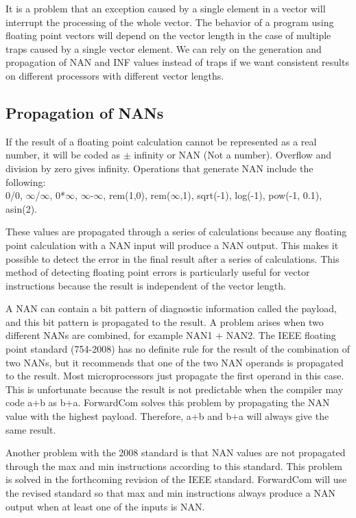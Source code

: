 \documentclass[forwardcom.tex]{subfiles}
\begin{document}
It is a problem that an exception caused by a single element in a vector will interrupt the processing of the whole vector. The behavior of a program using floating point vectors will depend on the vector length in the case of multiple traps caused by a single vector element. We can rely on the generation and propagation of NAN and INF values instead of traps if we want consistent results on different processors with different vector lengths. 
\vspace{2mm}

\subsection{Propagation of NANs}
\label{nanPropagation}
If the result of a floating point calculation cannot be represented as a real number, it will be coded as $\pm$ infinity or NAN (Not a number). Overflow and division by zero gives infinity.
Operations that generate NAN include the following:\\
0/0, $\infty$/$\infty$, 0*$\infty$, $\infty$-$\infty$, rem(1,0), rem($\infty$,1), sqrt(-1), log(-1), pow(-1, 0.1), asin(2).
\vspace{2mm}

These values are propagated through a series of calculations because any floating point calculation with a NAN input will produce a NAN output. This makes it possible to detect the error in the final result after a series of calculations. This method of detecting floating point errors is particularly useful for vector instructions because the result is independent of the vector length.
\vspace{2mm}

A NAN can contain a bit pattern of diagnostic information called the payload, and this bit pattern is propagated to the result. A problem arises when two different NANs are combined, for example NAN1 + NAN2. The IEEE floating point standard (754-2008) has no definite rule for the result of the combination of two NANs, but it recommends that one of the two NAN operands is propagated to the result. Most microprocessors just propagate the first operand in this case. This is unfortunate because the result is not predictable when the compiler may code a+b as b+a. ForwardCom solves this problem by propagating the NAN value with the highest payload. Therefore, a+b and b+a will always give the same result.
\vspace{2mm}

Another problem with the 2008 standard is that NAN values are not propagated through the max and min instructions according to this standard. This problem is solved in the forthcoming revision of the IEEE standard. ForwardCom will use the revised standard so that max and min instructions always produce a NAN output when at least one of the inputs is NAN.
\vspace{2mm}
\end{document}
